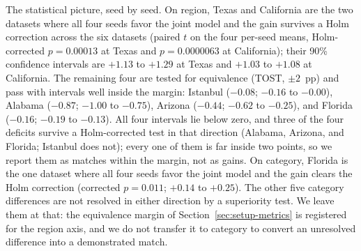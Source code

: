 The statistical picture, seed by seed. On region, Texas and California are the two datasets where
all four seeds favor the joint model and the gain survives a Holm correction across the six datasets
(paired $t$ on the four per-seed means, Holm-corrected $p=0.00013$ at Texas and $p=0.0000063$ at California); their 90\% confidence intervals are $+1.13$ to $+1.29$ at
Texas and $+1.03$ to $+1.08$ at California. The remaining four are tested for equivalence (TOST,
$\pm2$~pp) and pass with intervals well inside the margin: Istanbul ($-0.08$; $-0.16$ to $-0.00$),
Alabama ($-0.87$; $-1.00$ to $-0.75$), Arizona ($-0.44$; $-0.62$ to $-0.25$), and Florida ($-0.16$;
$-0.19$ to $-0.13$). All four intervals lie below zero, and three of the four deficits survive a
Holm-corrected test in that direction (Alabama, Arizona, and Florida; Istanbul does not); every one
of them is far inside two points, so we report them as matches within the margin, not as gains. On category, Florida is the one dataset where all four seeds favor the joint model and the
gain clears the Holm correction (corrected $p=0.011$; $+0.14$ to $+0.25$). The other five category
differences are not resolved in either direction by a superiority test. We leave them at that: the
equivalence margin of Section~\ref{sec:setup-metrics} is registered for the region axis, and we do
not transfer it to category to convert an unresolved difference into a demonstrated match.

